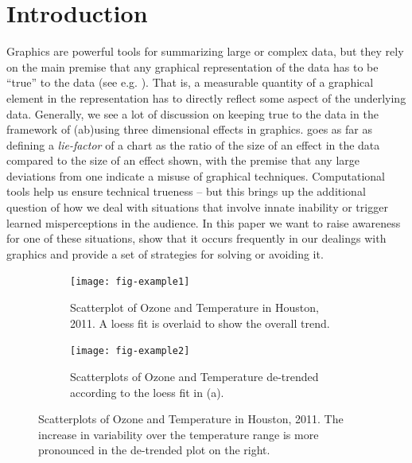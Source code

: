 \documentclass[11pt]{isuthesis}\usepackage[]{graphicx}\usepackage[]{color}
\begin{document}
\section{Introduction}
Graphics are powerful tools for summarizing large or complex data, but they rely on the main premise that any graphical representation of the data has to be ``true'' to the data (see e.g. \citet{tufte, wainer:2000, robbins:2005}). That is, a measurable quantity of a graphical element in the representation has to  directly reflect some aspect of the underlying data. Generally, we see a lot of discussion on keeping true to the data in the framework of (ab)using three dimensional effects in graphics. \cite{tufte} goes as far as defining a {\it lie-factor} of a chart as the ratio of the size of an effect in the data compared to the size of an effect shown, with the premise that any large deviations from one indicate a misuse of graphical techniques. Computational tools help us ensure technical trueness -- but this brings up the additional question of how we deal with situations that involve innate inability or trigger learned misperceptions in the audience. In this paper we want to raise awareness for one of these situations, show that it occurs frequently in our dealings with graphics and provide a set of strategies for solving or avoiding it.



\begin{figure}[h!tbp]\centering
\begin{subfigure}[b]{.45\linewidth}
  \centering
  \texttt{[image: fig-example1]}
  \caption[Scatterplot of Ozone and Temperature in Houston, 2011.]{\small Scatterplot of Ozone and Temperature in Houston, 2011. A loess fit is overlaid to show the overall trend.  \label{fig:example1}}
\end{subfigure}\hfill
\begin{subfigure}[b]{.45\linewidth}
  \centering
  \texttt{[image: fig-example2]}
  \caption[Residual Ozone]{\small Scatterplots of Ozone and Temperature de-trended according to the loess fit in (a). \\ \phantom{text to get to the next line}
  \label{fig:example2}}
\end{subfigure}
\caption[Scatterplots of Ozone and Temperature in Houston, 2011]{\label{fig:exampleFull1} Scatterplots of Ozone and Temperature in Houston, 2011. The increase in variability over the temperature range is more pronounced in the de-trended plot on the right.}
\end{figure}
\end{document}
